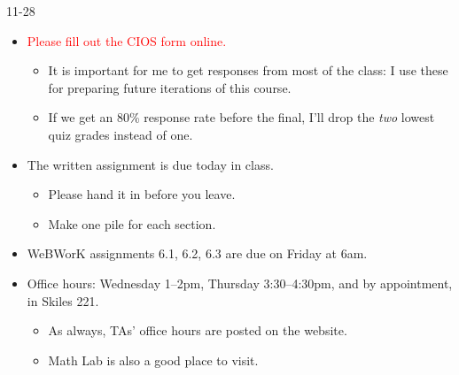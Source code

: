 


\begin{ann}{11-28}
  \begin{itemize}
    \item \textcolor{red}{Please fill out the CIOS form online.}
      \begin{itemize}
      \item It is important for me to get responses from most of the class: I
        use these for preparing future iterations of this course.
      \item If we get an 80\% response rate before the final, I'll drop
        the \emph{two} lowest quiz grades instead of one.
      \end{itemize}
      \bigskip

    \item The written assignment is due today in class.
      \begin{itemize}
      \item Please hand it in before you leave.
      \item Make one pile for each section.
      \end{itemize}
      \bigskip

    \item WeBWorK assignments 6.1, 6.2, 6.3 are due on Friday at 6am.
      \bigskip

    \item Office hours: Wednesday 1--2pm, Thursday 3:30--4:30pm, and by
      appointment, in Skiles 221.
      \begin{itemize}
      \item As always, TAs' office hours are posted on the website.
      \item Math Lab is also a good place to visit.
      \end{itemize}

  \end{itemize}
\end{ann}



